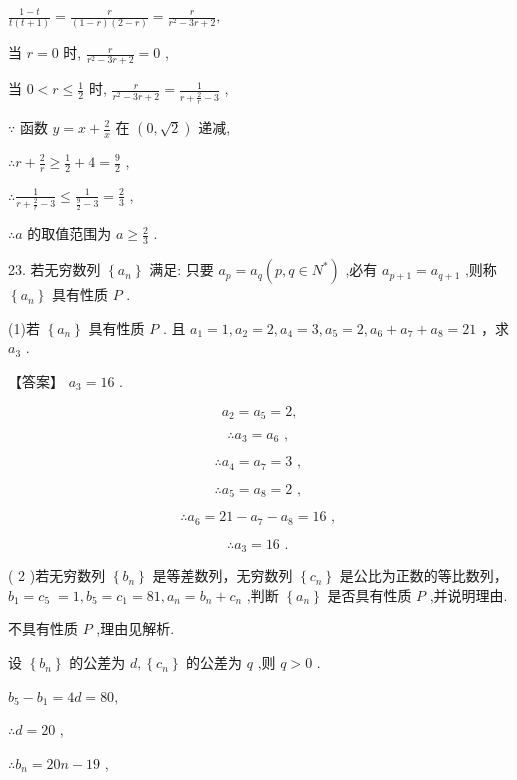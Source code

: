 \documentclass[10pt]{article}
\begin{document}
\(\frac{1 - t}{t\left( {t + 1}\right) } = \frac{r}{\left( {1 - r}\right) \left( {2 - r}\right) } = \frac{r}{{r}^{2} - {3r} + 2},\)

当 \(r = 0\) 时, \(\frac{r}{{r}^{2} - {3r} + 2} = 0\) ,

当 \(0 < r \leq  \frac{1}{2}\) 时, \(\frac{r}{{r}^{2} - {3r} + 2} = \frac{1}{r + \frac{2}{r} - 3}\) ,

\(\because\) 函数 \(y = x + \frac{2}{x}\) 在 \(\left( {0,\sqrt{2}}\right)\) 递减,

\(\therefore r + \frac{2}{r} \geq  \frac{1}{2} + 4 = \frac{9}{2}\) ,

\(\therefore \frac{1}{r + \frac{2}{r} - 3} \leq  \frac{1}{\frac{9}{2} - 3} = \frac{2}{3}\) ,

\(\therefore a\) 的取值范围为 \(a \geq  \frac{2}{3}\) .

23. 若无穷数列 \(\left\{  {a}_{n}\right\}\) 满足: 只要 \({a}_{p} = {a}_{q}\left( {p,q \in  {N}^{ * }}\right)\) ,必有 \({a}_{p + 1} = {a}_{q + 1}\) ,则称 \(\left\{  {a}_{n}\right\}\) 具有性质 \(P\) .

(1)若 \(\left\{  {a}_{n}\right\}\) 具有性质 \(P\) . 且 \({a}_{1} = 1,{a}_{2} = 2,{a}_{4} = 3,{a}_{5} = 2,{a}_{6} + {a}_{7} + {a}_{8} = {21}\) ，求 \({a}_{3}\) .

【答案】 \({a}_{3} = {16}\) .

\[
{a}_{2} = {a}_{5} = 2,
\]

\[
\therefore {a}_{3} = {a}_{6}\text{ , }
\]

\[
\therefore {a}_{4} = {a}_{7} = 3\text{ , }
\]

\[
\therefore {a}_{5} = {a}_{8} = 2\text{ , }
\]

\[
\therefore {a}_{6} = {21} - {a}_{7} - {a}_{8} = {16}\text{ , }
\]

\[
\therefore {a}_{3} = {16}\text{ . }
\]

( 2 )若无穷数列 \(\left\{  {b}_{n}\right\}\) 是等差数列，无穷数列 \(\left\{  {c}_{n}\right\}\) 是公比为正数的等比数列， \({b}_{1} = {c}_{5} \; = 1,{b}_{5} = {c}_{1} = {81},{a}_{n} = {b}_{n} + {c}_{n}\) ,判断 \(\left\{  {a}_{n}\right\}\) 是否具有性质 \(P\) ,并说明理由.

不具有性质 \(P\) ,理由见解析.

设 \(\left\{  {b}_{n}\right\}\) 的公差为 \(d,\left\{  {c}_{n}\right\}\) 的公差为 \(q\) ,则 \(q > 0\) .

\({b}_{5} - {b}_{1} = {4d} = {80},\)

\(\therefore d = {20}\) ,

\(\therefore {b}_{n} = {20n} - {19}\) ,
\end{document}
